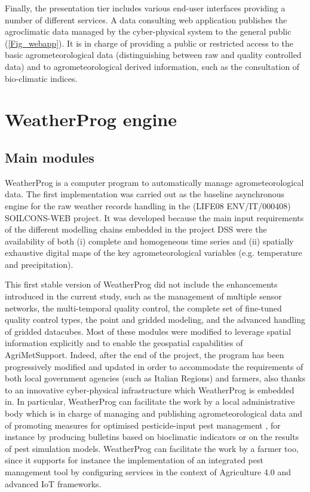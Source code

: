 \documentclass[authoryear,preprint,review,12pt]{elsarticle}
\newcommand{\note}[1]{\emph{\textcolor{red}{#1}}}
\newcommand{\statusblock}[3]{
    \ifthenelse{\equal{#2}{todo}}
        {\textcolor{red}{#1 (TO DO): #3}}
        {}
    \ifthenelse{\equal{#2}{wip}}
        {\textcolor{magenta}{#1 (IN PROGRESS): #3}}
        {}
    \ifthenelse{\equal{#2}{update}}
        {\textcolor{blue}{#1 (UPDATE): #3}}
        {}
    \ifthenelse{\equal{#2}{review}}
        {\textcolor{cyan}{#1 (REVIEW): #3}}
        {}
    \ifthenelse{\equal{#2}{done}}
        {\textcolor{PineGreen}{#1 (READY): #3}}
        {}
}
\begin{document}
Finally, the presentation tier includes various end-user interfaces providing a number of different services.
A data consulting web application publishes the agroclimatic data managed by the cyber-physical system to the general public (\cref{Fig_webapp}).
It is in charge of providing a public or restricted access to the basic agrometeorological data (distinguishing between raw and quality controlled data) and to agrometeorological derived information, such as the consultation of bio-climatic indices. %

\section{WeatherProg engine}\label{sec:weatherprog}
\subsection{Main modules}
WeatherProg \citep{langella:weatherprog2014} is a computer program to automatically manage agrometeorological data.
The first implementation was carried out as the baseline asynchronous engine for the raw weather records handling in the (LIFE08 ENV/IT/000408) SOILCONS-WEB project.
It was developed because the main input requirements of the different modelling chains embedded in the project DSS \citep{Terribile:soilconsweb:2015} were the availability of both (i) complete and homogeneous time series and (ii) spatially exhaustive digital maps of the key agrometeorological variables (e.g. temperature and precipitation). 

This first stable version of WeatherProg did not include the enhancements introduced in the current study, such as the management of multiple sensor networks, the multi-temporal quality control, the complete set of fine-tuned quality control types, the point and gridded modeling, and the advanced handling of gridded datacubes.
Most of these modules were modified to leverage spatial information explicitly and to enable the geospatial capabilities of Agri\-Met\-Support.
Indeed, after the end of the project, the program has been progressively modified and updated in order to accommodate the requirements of both local government agencies (such as Italian Regions) and farmers, also thanks to an innovative cyber-physical infrastructure which WeatherProg is embedded in.
In particular, WeatherProg can facilitate the work by a local administrative body which is in charge of managing and publishing agrometeorological data and of promoting measures for optimised pesticide-input pest management \citep{eu:dir128:2009}, for instance by producing bulletins based on bioclimatic indicators or on the results of pest simulation models.
WeatherProg can facilitate the work by a farmer too, since it supports for instance the implementation of an integrated pest management tool \citep{Terribile:dssvitis:2017} by configuring services in the context of Agriculture 4.0 and advanced IoT frameworks.
\end{document}
